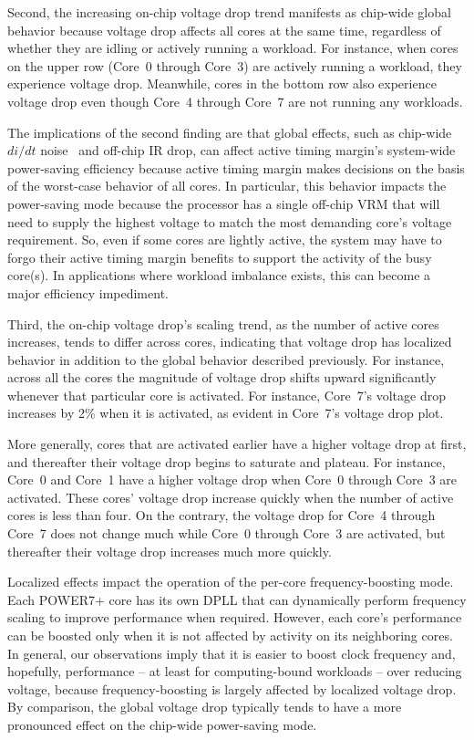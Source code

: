 Second, the increasing on-chip voltage drop trend manifests as chip-wide global behavior because voltage drop affects all cores at the same time, regardless of whether they are idling or actively running a workload. For instance, when cores on the upper row (Core~0 through Core~3) are actively running a workload, they experience voltage drop. Meanwhile, cores in the bottom row also experience voltage drop even though Core~4 through Core~7 are not running any workloads. 

The implications of the second finding are that global effects, such as chip-wide $di/dt$ noise~\cite{gupta2007understanding,miller2012vrsync,bertran2014voltage} and off-chip IR drop, can affect active timing margin's system-wide power-saving efficiency because active timing margin makes decisions on the basis of the worst-case behavior of all cores. In particular, this behavior impacts the power-saving mode because the processor has a single off-chip VRM that will need to supply the highest voltage to match the most demanding core's voltage requirement. So, even if some cores are lightly active, the system may have to forgo their active timing margin benefits to support the activity of the busy core(s). In applications where workload imbalance exists, this can become a major efficiency impediment. 

Third, the on-chip voltage drop's scaling trend, as the number of active cores increases, tends to differ across cores, indicating that voltage drop has localized behavior in addition to the global behavior described previously. For instance, across all the cores the magnitude of voltage drop shifts upward significantly whenever that particular core is activated. For instance, Core~7's voltage drop increases by 2\% when it is activated, as evident in Core~7's voltage drop plot.

More generally, cores that are activated earlier have a higher voltage drop at first, and thereafter their voltage drop begins to saturate and plateau. For instance, Core~0 and Core~1 have a higher voltage drop when Core~0 through Core~3 are activated. These cores' voltage drop increase quickly when the number of active cores is less than four. On the contrary, the voltage drop for Core~4 through Core~7 does not change much while Core~0 through Core~3 are activated, but thereafter their voltage drop increases much more quickly.

Localized effects impact the operation of the per-core frequency-boosting mode. Each POWER7+ core has its own DPLL that can dynamically perform frequency scaling to improve performance when required. However, each core's performance can be boosted only when it is not affected by activity on its neighboring cores. In general, our observations imply that it is easier to boost clock frequency and, hopefully, performance -- at least for computing-bound workloads -- over reducing voltage, because frequency-boosting is largely affected by localized voltage drop. By comparison, the global voltage drop typically tends to have a more pronounced effect on the chip-wide power-saving mode. 

